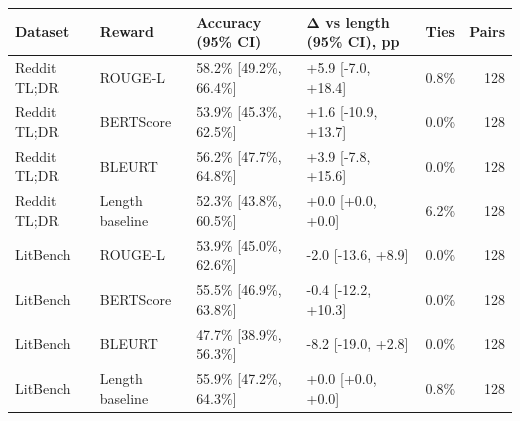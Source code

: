 \begin{tabular}{lllllr}
\toprule
Dataset & Reward & Accuracy (95\% CI) & Δ vs length (95\% CI), pp & Ties & Pairs \\
\midrule
Reddit TL;DR & ROUGE-L & 58.2\% [49.2\%, 66.4\%] & +5.9 [-7.0, +18.4] & 0.8\% & 128 \\
Reddit TL;DR & BERTScore & 53.9\% [45.3\%, 62.5\%] & +1.6 [-10.9, +13.7] & 0.0\% & 128 \\
Reddit TL;DR & BLEURT & 56.2\% [47.7\%, 64.8\%] & +3.9 [-7.8, +15.6] & 0.0\% & 128 \\
Reddit TL;DR & Length baseline & 52.3\% [43.8\%, 60.5\%] & +0.0 [+0.0, +0.0] & 6.2\% & 128 \\
LitBench & ROUGE-L & 53.9\% [45.0\%, 62.6\%] & -2.0 [-13.6, +8.9] & 0.0\% & 128 \\
LitBench & BERTScore & 55.5\% [46.9\%, 63.8\%] & -0.4 [-12.2, +10.3] & 0.0\% & 128 \\
LitBench & BLEURT & 47.7\% [38.9\%, 56.3\%] & -8.2 [-19.0, +2.8] & 0.0\% & 128 \\
LitBench & Length baseline & 55.9\% [47.2\%, 64.3\%] & +0.0 [+0.0, +0.0] & 0.8\% & 128 \\
\bottomrule
\end{tabular}
